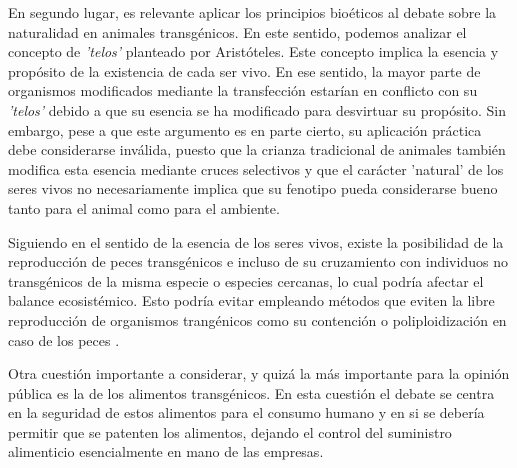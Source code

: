 \documentclass[fleqn,10pt]{SelfArx} %
\begin{document}
En segundo lugar, es relevante aplicar los principios bioéticos al debate sobre la naturalidad en animales transgénicos. En este sentido, podemos analizar el concepto de \textit{'telos'} planteado por Aristóteles. Este concepto implica la esencia y propósito de la existencia de cada ser vivo. En ese sentido, la mayor parte de organismos modificados mediante la transfección estarían en conflicto con su \textit{'telos'} debido a que su esencia se ha modificado para desvirtuar su propósito\cite{Rollin1998}. Sin embargo, pese a que este argumento es en parte cierto, su aplicación práctica debe considerarse inválida, puesto que la crianza tradicional de animales también modifica esta esencia mediante cruces selectivos y que el carácter 'natural' de los seres vivos no necesariamente implica que su fenotipo pueda considerarse bueno tanto para el animal como para el ambiente\cite{Verhoog2003294, Ormandy}. 

Siguiendo en el sentido de la esencia de los seres vivos, existe la posibilidad de la reproducción de peces transgénicos e incluso de su cruzamiento con individuos no transgénicos de la misma especie o especies cercanas, lo cual podría afectar el balance ecosistémico\cite{espinoza2012reproduccion, oke2013hybridization}. Esto podría evitar empleando métodos que eviten la libre reproducción de organismos trangénicos como su contención o poliploidización en caso de los peces \cite{pandian1998ploidy,wong2008transgenic}.

Otra cuestión importante a considerar, y quizá la más importante para la opinión pública es la de los alimentos transgénicos. En esta cuestión el debate se centra en la seguridad de estos alimentos para el consumo humano y en si se debería permitir que se patenten los alimentos, dejando el control del suministro alimenticio esencialmente en mano de las empresas\cite{berkowitz1994transgenic, Jefferson, ledford2013transgenic}.






\end{document}
